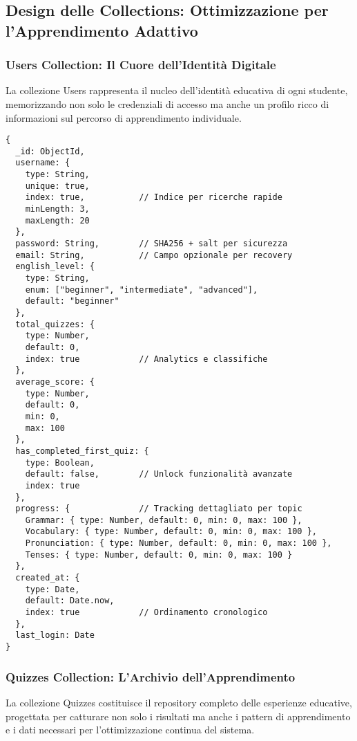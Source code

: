 \documentclass[12pt,a4paper]{article}
\begin{document}
\subsection{Design delle Collections: Ottimizzazione per l'Apprendimento Adattivo}
\label{subsec:collections-design}

\subsubsection{Users Collection: Il Cuore dell'Identità Digitale}

La collezione Users rappresenta il nucleo dell'identità educativa di ogni studente, memorizzando non solo le credenziali di accesso ma anche un profilo ricco di informazioni sul percorso di apprendimento individuale.

\begin{lstlisting}[style=mongostyle, caption=Struttura Ottimizzata della Users Collection]
{
  _id: ObjectId,
  username: {
    type: String,
    unique: true,
    index: true,           // Indice per ricerche rapide
    minLength: 3,
    maxLength: 20
  },
  password: String,        // SHA256 + salt per sicurezza
  email: String,           // Campo opzionale per recovery
  english_level: {
    type: String,
    enum: ["beginner", "intermediate", "advanced"],
    default: "beginner"
  },
  total_quizzes: {
    type: Number,
    default: 0,
    index: true            // Analytics e classifiche
  },
  average_score: {
    type: Number,
    default: 0,
    min: 0,
    max: 100
  },
  has_completed_first_quiz: {
    type: Boolean,
    default: false,        // Unlock funzionalità avanzate
    index: true
  },
  progress: {              // Tracking dettagliato per topic
    Grammar: { type: Number, default: 0, min: 0, max: 100 },
    Vocabulary: { type: Number, default: 0, min: 0, max: 100 },
    Pronunciation: { type: Number, default: 0, min: 0, max: 100 },
    Tenses: { type: Number, default: 0, min: 0, max: 100 }
  },
  created_at: {
    type: Date,
    default: Date.now,
    index: true            // Ordinamento cronologico
  },
  last_login: Date
}
\end{lstlisting}

\subsubsection{Quizzes Collection: L'Archivio dell'Apprendimento}

La collezione Quizzes costituisce il repository completo delle esperienze educative, progettata per catturare non solo i risultati ma anche i pattern di apprendimento e i dati necessari per l'ottimizzazione continua del sistema.
\end{document}
